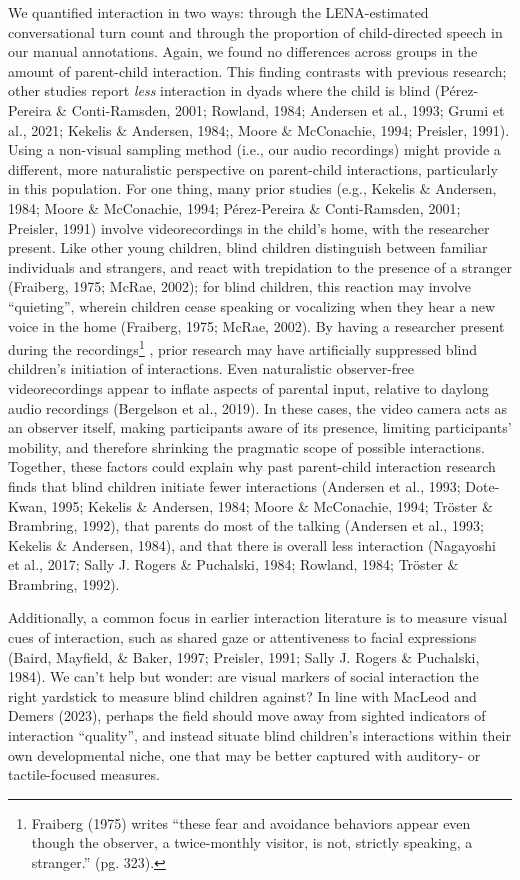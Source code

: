 \documentclass[
  man]{apa6}
\begin{document}
We quantified interaction in two ways: through the LENA-estimated conversational turn count and through the proportion of child-directed speech in our manual annotations. Again, we found no differences across groups in the amount of parent-child interaction. This finding contrasts with previous research; other studies report \emph{less} interaction in dyads where the child is blind (Pérez-Pereira \& Conti-Ramsden, 2001; Rowland, 1984; Andersen et al., 1993; Grumi et al., 2021; Kekelis \& Andersen, 1984;, Moore \& McConachie, 1994; Preisler, 1991). Using a non-visual sampling method (i.e., our audio recordings) might provide a different, more naturalistic perspective on parent-child interactions, particularly in this population. For one thing, many prior studies (e.g., Kekelis \& Andersen, 1984; Moore \& McConachie, 1994; Pérez-Pereira \& Conti-Ramsden, 2001; Preisler, 1991) involve videorecordings in the child's home, with the researcher present. Like other young children, blind children distinguish between familiar individuals and strangers, and react with trepidation to the presence of a stranger (Fraiberg, 1975; McRae, 2002); for blind children, this reaction may involve ``quieting'', wherein children cease speaking or vocalizing when they hear a new voice in the home (Fraiberg, 1975; McRae, 2002). By having a researcher present during the recordings\footnote{Fraiberg (1975) writes ``these fear and avoidance behaviors appear even though the observer, a twice-monthly visitor, is not, strictly speaking, a stranger.'' (pg. 323).} , prior research may have artificially suppressed blind children's initiation of interactions. Even naturalistic observer-free videorecordings appear to inflate aspects of parental input, relative to daylong audio recordings (Bergelson et al., 2019). In these cases, the video camera acts as an observer itself, making participants aware of its presence, limiting participants' mobility, and therefore shrinking the pragmatic scope of possible interactions. Together, these factors could explain why past parent-child interaction research finds that blind children initiate fewer interactions (Andersen et al., 1993; Dote-Kwan, 1995; Kekelis \& Andersen, 1984; Moore \& McConachie, 1994; Tröster \& Brambring, 1992), that parents do most of the talking (Andersen et al., 1993; Kekelis \& Andersen, 1984), and that there is overall less interaction (Nagayoshi et al., 2017; Sally J. Rogers \& Puchalski, 1984; Rowland, 1984; Tröster \& Brambring, 1992).

Additionally, a common focus in earlier interaction literature is to measure visual cues of interaction, such as shared gaze or attentiveness to facial expressions (Baird, Mayfield, \& Baker, 1997; Preisler, 1991; Sally J. Rogers \& Puchalski, 1984). We can't help but wonder: are visual markers of social interaction the right yardstick to measure blind children against? In line with MacLeod and Demers (2023), perhaps the field should move away from sighted indicators of interaction ``quality'', and instead situate blind children's interactions within their own developmental niche, one that may be better captured with auditory- or tactile-focused measures.
\end{document}
